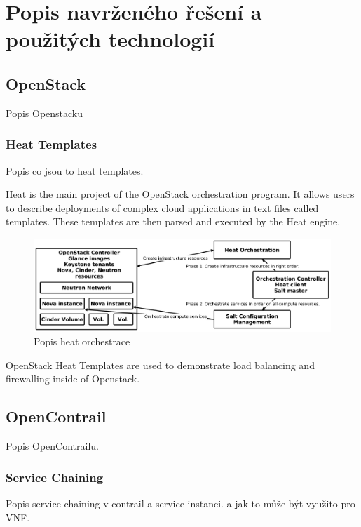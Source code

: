 \chapter{Popis navrženého řešení a použitých technologií}

\section{OpenStack}\label{sub:interaction}

Popis Openstacku

\subsection{Heat Templates}

Popis co jsou to heat templates.

Heat is the main project of the OpenStack orchestration program. It allows users to describe deployments of complex cloud applications in text files called templates. These templates are then parsed and executed by the Heat engine.

\begin{figure}[h]
\begin{centering}
\includegraphics[scale=0.21]{images/heat}
\par\end{centering}
\caption{Popis heat orchestrace\label{fig:heat}}
\end{figure}

OpenStack Heat Templates are used to demonstrate load balancing and firewalling inside of Openstack.

\section{OpenContrail}\label{sub:interaction}

Popis OpenContrailu.

\subsection{Service Chaining}

Popis service chaining v contrail a service instanci.
a jak to může být využito pro VNF.